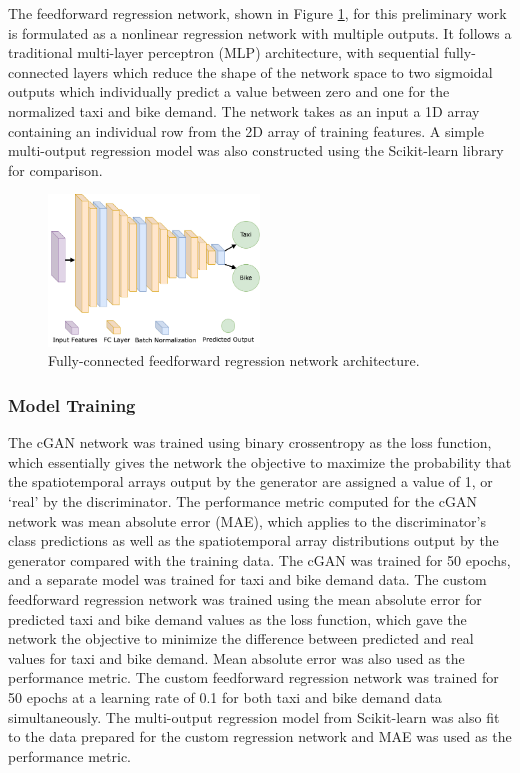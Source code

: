 \documentclass[conference]{IEEEtran}
\begin{document}
The feedforward regression network, shown in Figure \ref{fig:ff}, for this preliminary work is formulated as a nonlinear regression network with multiple outputs. It 
follows a traditional multi-layer perceptron (MLP) architecture, with sequential fully-connected layers which reduce the shape of
the network space to two sigmoidal outputs which individually predict a value between zero and one for the normalized taxi and 
bike demand. The network takes as an input a 1D array containing an individual row from the 2D array of training features. A simple 
multi-output regression model was also constructed using the Scikit-learn library \cite{scikit-learn} for comparison.

\begin{figure}[t]
  \centerline{\includegraphics[width=0.5\textwidth]{figs/ffNetwork.png}}
  \caption{Fully-connected feedforward regression network architecture.}
  \label{fig:ff}
  \end{figure}

\subsubsection{Model Training}
The cGAN network was trained using binary crossentropy as the loss function, which essentially gives the network the objective to
 maximize the probability that the spatiotemporal arrays output by the generator are assigned a value of 1, or ‘real’ by the 
 discriminator. The performance metric computed for the cGAN network was mean absolute error (MAE), which applies to the discriminator's class predictions 
 as well as the
 spatiotemporal array distributions output by the generator compared with the training data. The cGAN was trained for 50 epochs,
  and a separate model was trained for taxi and bike demand data. 
The custom feedforward regression network was trained using the mean absolute error for predicted taxi and bike demand values as the 
loss function,
 which gave the network the objective to minimize the difference between predicted and real values for taxi and bike demand. 
 Mean absolute error was also used as the performance metric. The custom feedforward regression network was trained for 50 epochs at a 
 learning 
 rate of 0.1 for both taxi and bike demand data simultaneously. The multi-output regression model from Scikit-learn was also fit to the
 data prepared for the custom regression network and MAE was used as the performance metric.
\end{document}
